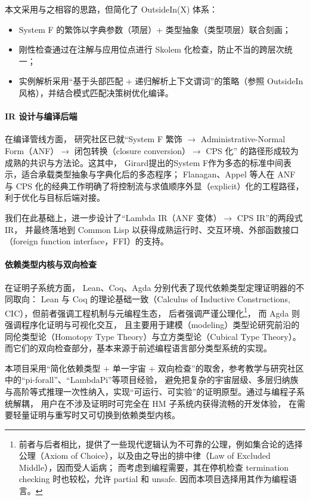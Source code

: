 \documentclass[a4paper, 11pt]{article}
\theoremstyle{remark}\newtheorem*{remark}{Remark}
\theoremstyle{definition}\newtheorem*{definition}{Definition}
\begin{document}
本文采用与之相容的思路，但简化了 OutsideIn(X) 体系：
\begin{itemize}\itemsep0em
  \item System F 的繁饰以字典参数（项层）+ 类型抽象（类型项层）联合刻画；
  \item 刚性检查通过在注解与应用位点进行 Skolem 化检查，防止不当的跨层次统一；
  \item 实例解析采用“基于头部匹配 + 递归解析上下文谓词”的策略（参照 OutsideIn 风格），并结合模式匹配决策树优化编译。
\end{itemize}

\paragraph{IR 设计与编译后端} 在编译管线方面，
研究社区已就“System F 繁饰 $\to$ Administrative-Normal Form（ANF）$\to$ 闭包转换（closure conversion）$\to$ CPS 化”
的路径形成较为成熟的共识与方法论。这其中，
Girard提出的System F作为多态\lambdacalc 的标准中间表示，适合承载类型抽象与字典化后的多态程序；
Flanagan、Appel 等人在 ANF 与 CPS 化的经典工作明确了将控制流与求值顺序外显（explicit）化的工程路径，
利于优化与目标后端对接。

我们在此基础上，进一步设计了“Lambda IR（ANF 变体）$\to$ CPS IR”的两段式IR，
并最终落地到 Common Lisp 以获得成熟运行时、交互环境、外部函数接口（foreign function interface，FFI）的支持。

\paragraph{依赖类型内核与双向检查} 在证明子系统方面，
Lean、Coq、Agda 分别代表了现代依赖类型定理证明器的不同取向：
Lean 与 Coq 的理论基础一致（Calculus of Inductive Constructions, CIC），但前者强调工程机制与元编程生态，
后者强调严谨公理化\footnote{
  前者与后者相比，提供了一些现代逻辑认为不可靠的公理，例如集合论的选择公理（Axiom of Choice），以及由之导出的排中律（Law of Excluded Middle），因而受人诟病；
  而考虑到编程需要，其在停机检查 termination checking 时也较松，允许 partial 和 unsafe. 因而本项目选择用其作为编程语言。
}，
而 Agda 则强调程序化证明与可视化交互，
且主要用于建模（modeling）类型论研究前沿的同伦类型论（Homotopy Type Theory）与立方类型论（Cubical Type Theory）。
而它们的双向检查部分，基本来源于前述编程语言部分类型系统的实现。

本项目采用“简化依赖类型 + 单一宇宙 + 双向检查”的取舍，参考教学与研究社区中的“pi-forall”、“LambdaPi”等项目经验，
避免把复杂的宇宙层级、多层归纳族与高阶等式推理一次性纳入，实现“可运行、可实验”的证明原型。通过与编程子系统解耦，
用户在不涉及证明时可完全在 HM 子系统内获得流畅的开发体验，
在需要轻量证明与重写时又可切换到依赖类型内核。
\end{document}
